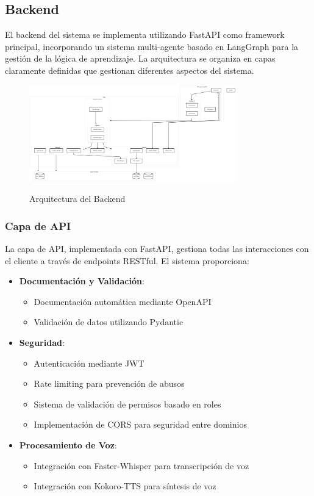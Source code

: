 \subsection{Backend}
\label{backend}

El backend del sistema se implementa utilizando FastAPI como framework principal, incorporando un sistema multi-agente basado en LangGraph para la gestión de la lógica de aprendizaje. La arquitectura se organiza en capas claramente definidas que gestionan diferentes aspectos del sistema.

\begin{figure}[H]
	\centering
	\includegraphics[width=0.8\textwidth]{figuras/backend.png}
	\label{fig:arquitectura-backend}
	\caption{Arquitectura del Backend}
\end{figure}

\subsubsection{Capa de API}
\label{capa-api}

La capa de API, implementada con FastAPI, gestiona todas las interacciones con el cliente a través de endpoints RESTful. El sistema proporciona:

\begin{itemize}
    \item \textbf{Documentación y Validación}:
    \begin{itemize}
        \item Documentación automática mediante OpenAPI
        \item Validación de datos utilizando Pydantic
    \end{itemize}

    \item \textbf{Seguridad}:
    \begin{itemize}
        \item Autenticación mediante JWT
        \item Rate limiting para prevención de abusos
        \item Sistema de validación de permisos basado en roles
        \item Implementación de CORS para seguridad entre dominios
    \end{itemize}

    \item \textbf{Procesamiento de Voz}:
    \begin{itemize}
        \item Integración con Faster-Whisper para transcripción de voz
        \item Integración con Kokoro-TTS para síntesis de voz
    \end{itemize}
\end{itemize}
